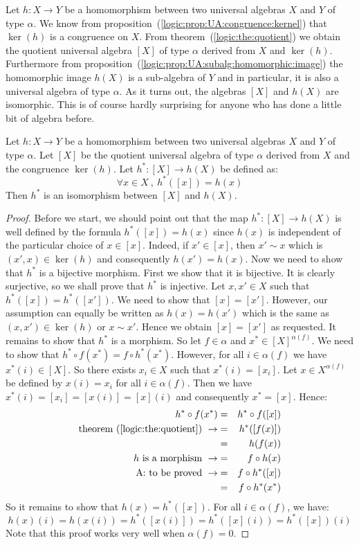 Let  $h:X\to Y$ be a homomorphism between two universal algebras $X$
and $Y$ of type $\alpha$. We know from
proposition~(\ref{logic:prop:UA:congruence:kernel}) that $\ker(h)$
is a congruence on $X$. From theorem~(\ref{logic:the:quotient}) we
obtain the quotient universal algebra $[X]$ of type $\alpha$ derived
from $X$ and $\ker(h)$. Furthermore from
proposition~(\ref{logic:prop:UA:subalg:homomorphic:image}) the
homomorphic image $h(X)$ is a sub-algebra of $Y$ and in particular,
it is also a universal algebra of type $\alpha$. As it turns out,
the algebras $[X]$ and $h(X)$ are isomorphic. This is of course
hardly surprising for anyone who has done a little bit of algebra
before. 
\begin{theorem}\label{logic:the:UA:firstiso}
Let $h:X\to Y$ be a homomorphism between two universal algebras $X$
and $Y$ of type $\alpha$. Let $[X]$ be the quotient universal
algebra of type $\alpha$ derived from $X$ and the congruence
$\ker(h)$. Let $h^{*}:[X]\to h(X)$ be defined as:
    \[
    \forall x\in X\ ,\ h^{*}([x])=h(x)
    \]
Then $h^{*}$ is an isomorphism between $[X]$ and $h(X)$.
\end{theorem}
\begin{proof}
Before we start, we should point out that the map $h^{*}:[X]\to
h(X)$ is well defined by the formula $h^{*}([x])=h(x)$ since $h(x)$
is independent of the particular choice of $x\in [x]$. Indeed, if
$x'\in [x]$, then $x'\sim x$ which is $(x',x)\in\ker(h)$ and
consequently $h(x')=h(x)$. Now we need to show that $h^{*}$ is a
bijective morphism. First we show that it is bijective. It is
clearly surjective, so we shall prove that $h^{*}$ is injective. Let
$x,x'\in X$ such that $h^{*}([x])=h^{*}([x'])$. We need to show that
$[x]=[x']$. However, our assumption can equally be written as
$h(x)=h(x')$ which is the same as $(x,x')\in\ker(h)$ or $x\sim x'$.
Hence we obtain $[x]=[x']$ as requested. It remains to show that
$h^{*}$ is a morphism. So let $f\in\alpha$ and
$x^{*}\in[X]^{\alpha(f)}$. We need to show that $h^{*}\circ
f(x^{*})=f\circ h^{*}(x^{*})$. However, for all $i\in\alpha(f)$ we
have $x^{*}(i)\in[X]$. So there exists $x_{i}\in X$ such that
$x^{*}(i)=[x_{i}]$. Let $x\in X^{\alpha(f)}$ be defined by
$x(i)=x_{i}$ for all $i\in\alpha(f)$. Then we have
$x^{*}(i)=[x_{i}]=[x(i)]=[x](i)$ and consequently $x^{*}=[x]$.
Hence:
    \begin{eqnarray*}
    h^{*}\circ f(x^{*})&=&h^{*}\circ f([x])\\
    \mbox{theorem~(\ref{logic:the:quotient})}\ \rightarrow
    &=&h^{*}([f(x)])\\
    &=&h(f(x))\\
    \mbox{$h$ is a morphism}\ \rightarrow&=&f\circ h(x)\\
    \mbox{A: to be proved}\ \rightarrow&=&f\circ h^{*}([x])\\
    &=&f\circ h^{*}(x^{*})
    \end{eqnarray*}
So it remains to show that $h(x)=h^{*}([x])$. For all
$i\in\alpha(f)$, we have:
    \[
    h(x)(i)=h(x(i))=h^{*}([x(i)])=h^{*}([x](i))=h^{*}([x])(i)
    \]
Note that this proof works very well when $\alpha(f)=0$.
\end{proof}


